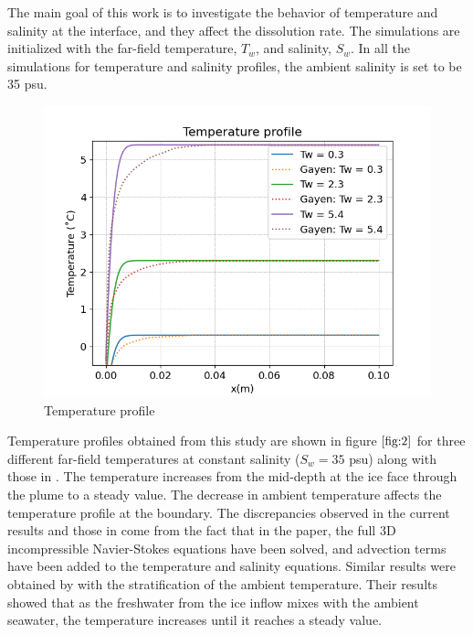 \documentclass[11pt,a4paper]{article}
\begin{document}
    \bigskip 
    
    The main goal of this work is to investigate the behavior of temperature and salinity at the interface, and they affect the dissolution rate. The simulations are initialized with the far-field temperature, $T_w$, and salinity, $S_w$. In all the simulations for temperature and salinity profiles, the ambient salinity is set to be 35 psu.
	
	\begin{figure}[H]
	    
	    \centering 
	    \includegraphics[width=12cm]{tempProfile}
	    \caption{Temperature profile}
	    \label{fig:2}
	\end{figure}
	
	
	Temperature profiles obtained from this study are shown in figure $\ref{fig:2}$ for three different far-field temperatures at constant salinity ($S_w = 35$ psu) along with those in \citet{gayen2016simulation}. The temperature increases from the mid-depth at the ice face through the plume to a steady value. The decrease in ambient temperature affects the temperature profile at the boundary. The discrepancies observed in the current results and those in \citet{gayen2016simulation} come from the fact that in the paper, the full 3D incompressible Navier-Stokes equations have been solved, and advection terms have been added to the temperature and salinity equations. Similar results were obtained by \cite{jenkins2011convection} with the stratification of the ambient temperature. Their results showed that as the freshwater from the ice inflow mixes with the ambient seawater, the temperature increases until it reaches a steady value.
	
\end{document}
